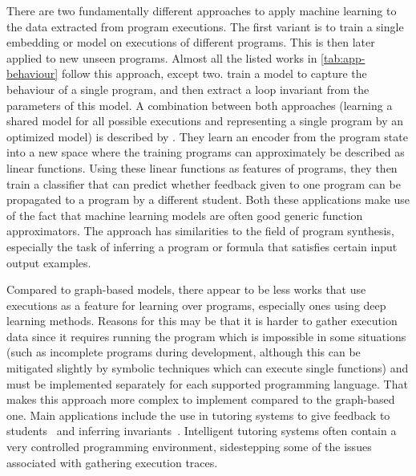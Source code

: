 \documentclass[sigconf,authordraft=true,nonacm=true]{acmart}
\begin{document}
There are two fundamentally different approaches to apply machine learning to the data extracted from program executions.
The first variant is to train a single embedding or model on executions of different programs.
This is then later applied to new unseen programs.
Almost all the listed works in \cref{tab:app-behaviour} follow this approach, except two.
\citet{yao_learning_2020} train a model to capture the behaviour of a single program, and then extract a loop invariant from the parameters of this model.
A combination between both approaches (learning a shared model for all possible executions and representing a single program by an optimized model) is described by \citet{piech_learning_2015}.
They learn an encoder from the program state into a new space where the training programs can approximately be described as linear functions.
Using these linear functions as features of programs, they then train a classifier that can predict whether feedback given to one program can be propagated to a program by a different student.
Both these applications make use of the fact that machine learning models are often good generic function approximators.
The approach has similarities to the field of program synthesis, especially the task of inferring a program or formula that satisfies certain input output examples.

Compared to graph-based models, there appear to be less works that use executions as a feature for learning over programs, especially ones using deep learning methods.
Reasons for this may be that it is harder to gather execution data since it requires running the program which is impossible in some situations (such as incomplete programs during development, although this can be mitigated slightly by symbolic techniques which can execute single functions) and must be implemented separately for each supported programming language.
That makes this approach more complex to implement compared to the graph-based one.
Main applications include the use in tutoring systems to give feedback to students~\cite{piech_learning_2015,paasen_execution_2016} and inferring invariants~\cite{yao_learning_2020,padhi_data-driven_2016,brockschmidt_learning_2017}.
Intelligent tutoring systems often contain a very controlled programming environment, sidestepping some of the issues associated with gathering execution traces.
\end{document}
